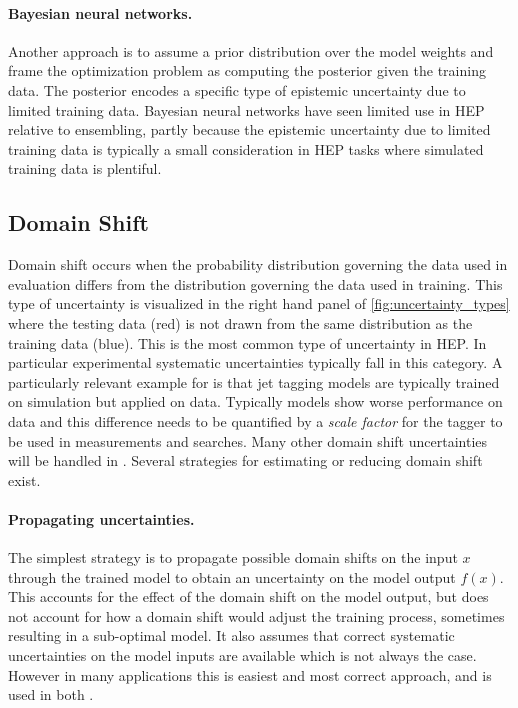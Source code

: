 \paragraph{Bayesian neural networks.}
Another approach is to assume a prior distribution over the model weights and frame the optimization problem as computing the posterior given the training data.
The posterior encodes a specific type of epistemic uncertainty due to limited training data.
Bayesian neural networks have seen limited use in HEP~\cite{Bollweg:2019skg} relative to ensembling, partly because the epistemic uncertainty due to limited training data is typically a small consideration in HEP tasks where simulated training data is plentiful.

\subsection{Domain Shift}
\label{sec:domain_shift}

Domain shift occurs when the probability distribution governing the data used in evaluation differs from the distribution governing the data used in training.
This type of uncertainty is visualized in the right hand panel of \cref{fig:uncertainty_types} where the testing data (red) is not drawn from the same distribution as the training data (blue).
This is the most common type of uncertainty in HEP.
In particular experimental systematic uncertainties typically fall in this category.
A particularly relevant example for  is that jet tagging models are typically trained on simulation but applied on data.
Typically models show worse performance on data and this difference needs to be quantified by a \textit{scale factor} for the tagger to be used in measurements and searches.
Many other domain shift uncertainties will be handled in .
Several strategies for estimating or reducing domain shift exist.

\paragraph{Propagating uncertainties.}
The simplest strategy is to propagate possible domain shifts on the input $x$ through the trained model to obtain an uncertainty on the model output $f(x)$.
This accounts for the effect of the domain shift on the model output, but does not account for how a domain shift would adjust the training process, sometimes resulting in a sub-optimal model.
It also assumes that correct systematic uncertainties on the model inputs are available which is not always the case.
However in many applications this is easiest and most correct approach, and is used in both .

